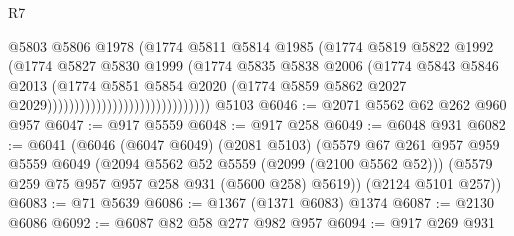 \begin{lexlean}{R7}
\begin{coremodule}
                                                  @5803
                                                  @5806
                                                  @1978
                                                  (@1774
                                                    @5811
                                                    @5814
                                                    @1985
                                                    (@1774
                                                      @5819
                                                      @5822
                                                      @1992
                                                      (@1774
                                                        @5827
                                                        @5830
                                                        @1999
                                                        (@1774
                                                          @5835
                                                          @5838
                                                          @2006
                                                          (@1774
                                                            @5843
                                                            @5846
                                                            @2013
                                                            (@1774
                                                              @5851
                                                              @5854
                                                              @2020
                                                              (@1774
                                                                @5859
                                                                @5862
                                                                @2027
                                                                @2029))))))))))))))))))))))))))))))
    @5103
@6046 := @2071 @5562 @62 @262 @960 @957
@6047 := @917 @5559
@6048 := @917 @258
@6049 := @6048 @931
@6082 := @6041
    (@6046
      (@6047 @6049)
      (@2081 @5103)
      (@5579
        @67
        @261
        @957
        @959
        @5559
        @6049
        (@2094 @5562 @52 @5559 (@2099 (@2100 @5562 @52)))
        (@5579 @259 @75 @957 @957 @258 @931 (@5600 @258) @5619))
      (@2124 @5101 @257))
@6083 := @71 @5639
@6086 := @1367 (@1371 @6083) @1374
@6087 := @2130 @6086
@6092 := @6087 @82 @58 @277 @982 @957
@6094 := @917 @269 @931

\end{coremodule}
\end{lexlean}
